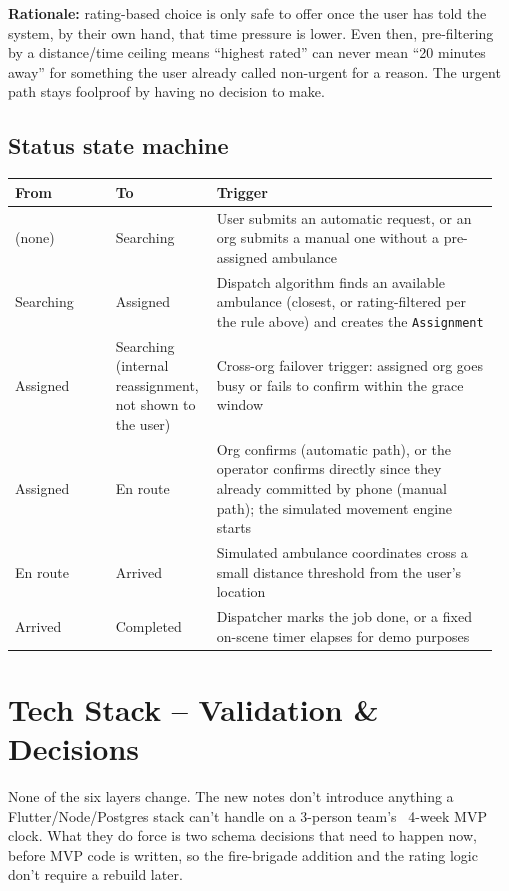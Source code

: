 \documentclass[11pt,a4paper]{article}
\begin{document}
\textbf{Rationale:} rating-based choice is only safe to offer once the user has told the system, by their own hand, that time pressure is lower. Even then, pre-filtering by a distance/time ceiling means ``highest rated'' can never mean ``20 minutes away'' for something the user already called non-urgent for a reason. The urgent path stays foolproof by having no decision to make.

\subsection{Status state machine}

\begin{longtable}{p{0.20\linewidth} p{0.20\linewidth} p{0.56\linewidth}}
\toprule
\textbf{From} & \textbf{To} & \textbf{Trigger} \\
\midrule
\endhead
(none) & Searching & User submits an automatic request, or an org submits a manual one without a pre-assigned ambulance \\
\addlinespace
Searching & Assigned & Dispatch algorithm finds an available ambulance (closest, or rating-filtered per the rule above) and creates the \texttt{Assignment} \\
\addlinespace
Assigned & Searching (internal reassignment, not shown to the user) & Cross-org failover trigger: assigned org goes busy or fails to confirm within the grace window \\
\addlinespace
Assigned & En route & Org confirms (automatic path), or the operator confirms directly since they already committed by phone (manual path); the simulated movement engine starts \\
\addlinespace
En route & Arrived & Simulated ambulance coordinates cross a small distance threshold from the user's location \\
\addlinespace
Arrived & Completed & Dispatcher marks the job done, or a fixed on-scene timer elapses for demo purposes \\
\bottomrule
\end{longtable}

\section{Tech Stack -- Validation \& Decisions}

None of the six layers change. The new notes don't introduce anything a Flutter/Node/Postgres stack can't handle on a 3-person team's ~4-week MVP clock. What they do force is two schema decisions that need to happen now, before MVP code is written, so the fire-brigade addition and the rating logic don't require a rebuild later.
\end{document}
